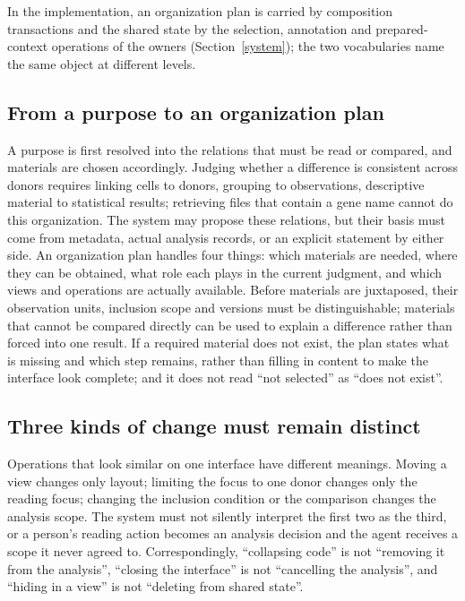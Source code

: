 \documentclass[11pt]{article}
\begin{document}
In the implementation, an organization plan is carried by composition transactions and the shared state by the selection, annotation and prepared-context operations of the owners (Section~\ref{system}); the two vocabularies name the same object at different levels.

\subsection{From a purpose to an organization plan}\label{org-plan}

A purpose is first resolved into the relations that must be read or compared, and materials are chosen accordingly. Judging whether a difference is consistent across donors requires linking cells to donors, grouping to observations, descriptive material to statistical results; retrieving files that contain a gene name cannot do this organization. The system may propose these relations, but their basis must come from metadata, actual analysis records, or an explicit statement by either side. An organization plan handles four things: which materials are needed, where they can be obtained, what role each plays in the current judgment, and which views and operations are actually available. Before materials are juxtaposed, their observation units, inclusion scope and versions must be distinguishable; materials that cannot be compared directly can be used to explain a difference rather than forced into one result. If a required material does not exist, the plan states what is missing and which step remains, rather than filling in content to make the interface look complete; and it does not read ``not selected'' as ``does not exist''.

\subsection{Three kinds of change must remain distinct}\label{three-changes}

Operations that look similar on one interface have different meanings. Moving a view changes only layout; limiting the focus to one donor changes only the reading focus; changing the inclusion condition or the comparison changes the analysis scope. The system must not silently interpret the first two as the third, or a person's reading action becomes an analysis decision and the agent receives a scope it never agreed to. Correspondingly, ``collapsing code'' is not ``removing it from the analysis'', ``closing the interface'' is not ``cancelling the analysis'', and ``hiding in a view'' is not ``deleting from shared state''.
\end{document}
